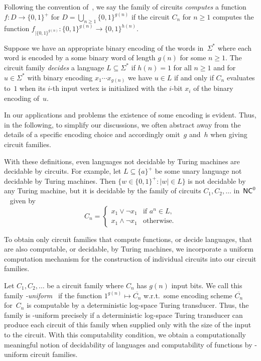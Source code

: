 Following the convention of~\cite{DBLP:conf/fct/Cook83,DBLP:journals/iandc/Cook85},
we say the family of circuits \emph{computes} a 
function $f \colon D \to \{0,1\}^+$ for $D = \bigcup_{n \ge 1} \{ 0,1 \}^{g(n)}$
if the circuit $C_n$ for $n \ge 1$ computes
the function $f_{|\{0,1\}^{g(n)}} \colon \{0,1\}^{g(n)} \to \{0,1\}^{h(n)}$.

Suppose we have an appropriate binary encoding of the words in~$\Sigma^*$
where each word is encoded by a some binary word of length $g(n)$
for some $n \ge 1$. The circuit family \emph{decides} a language
$L \subseteq \Sigma^*$ if $h(n) = 1$ for all $n \ge 1$ and for $u \in \Sigma^*$
with binary encoding $x_1 \cdots x_{g(n)}$
we have $u\in L$ if and only if $C_n$ evaluates to~$1$
when its $i$-th input vertex is initialized with the $i$-bit $x_i$
of the binary encoding of~$u$.

In our applications and problems the existence of some encoding is evident.
Thus, in the following, to simplify our discussions, we often abstract 
away from the details of a specific encoding choice and accordingly omit~$g$ and~$h$
when giving circuit families.

With these definitions, even languages not decidable
by Turing machines are decidable by circuits.
For example, let $L \subseteq \{a\}^+$
be some unary language not decidable by Turing
machines. Then $\{ w \in \{0,1\}^+ : |w| \in L \}$
is not decidable by any Turing machine,
but it is decidable by the family of circuits 
$C_1, C_2, \ldots$ in~$\textup{\textsf{NC}}^0$~\cite[p.~142]{Straubing94}
given by
\[
C_n = \begin{cases}
	x_1 \lor \neg x_1  & \text{if } a^n \in L, \\
	x_1 \land \neg x_1 & \text{otherwise.}
\end{cases}
\]

To obtain only circuit families that compute functions, or decide languages,
that are also computable, or decidable, by Turing machines,
we incorporate a uniform computation mechanism for the construction of individual circuits
into our circuit families.

Let $C_1, C_2, \ldots$ be a circuit family where $C_n$ has $g(n)$ input bits.
We call this family \emph{\LOGSPACE-uniform}~\cite{DBLP:conf/stoc/Cook79}
if the function $1^{g(n)} \mapsto  \overline{C_n}$
w.r.t.~some encoding scheme $\overline{C_n}$ for~$C_n$
is computable by a deterministic log-space Turing transducer.
Thus, the family is \LOGSPACE-uniform
precisely if a deterministic log-space Turing transducer
can produce each circuit of this family when supplied only with the size of the input
to the circuit.
With this computability condition, we obtain a computationally meaningful notion of decidability of languages and computability of functions by \LOGSPACE-uniform circuit families.


